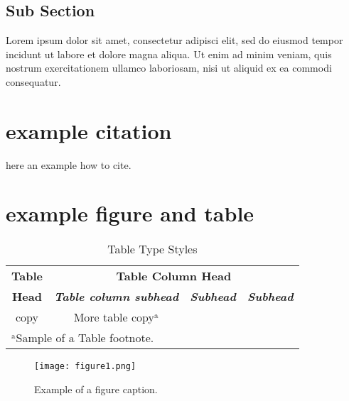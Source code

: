 \documentclass[conference,a4paper]{IEEEtran}
\begin{document}
\subsection{Sub Section}\label{sec:subsection}
Lorem ipsum dolor sit amet, consectetur adipisci elit, sed do eiusmod tempor incidunt ut labore et dolore magna aliqua. Ut enim ad minim veniam, quis nostrum exercitationem ullamco laboriosam, nisi ut aliquid ex ea commodi consequatur.

\section{example citation}

here an example how to cite\cite{stella2018bots,saracco2015randomizing}.



\section{example figure and table}
\begin{table}[htbp]
\caption{Table Type Styles}
\begin{center}
\begin{tabular}{|c|c|c|c|}
\hline
\textbf{Table}&\multicolumn{3}{|c|}{\textbf{Table Column Head}} \\
\cline{2-4} 
\textbf{Head} & \textbf{\textit{Table column subhead}}& \textbf{\textit{Subhead}}& \textbf{\textit{Subhead}} \\
\hline
copy& More table copy$^{\mathrm{a}}$& &  \\
\hline
\multicolumn{4}{l}{$^{\mathrm{a}}$Sample of a Table footnote.}
\end{tabular}
\label{tab1}
\end{center}
\end{table}

\begin{figure}[htbp]
\centerline{\texttt{[image: figure1.png]}}
\caption{Example of a figure caption.}
\label{fig}
\end{figure}




\end{document}
